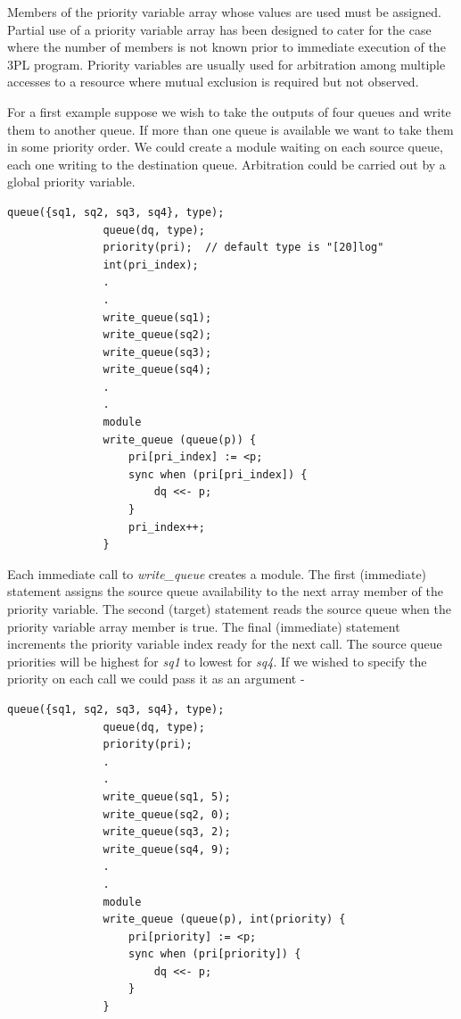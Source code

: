         Members of the priority variable array whose values are used must be
        assigned. Partial use of a priority variable array has been designed to
        cater for the case where the number of members is not known prior to
        immediate execution of the 3PL program. Priority variables are usually
        used for arbitration among multiple accesses to a resource where mutual
        exclusion is required but not observed.

        For a first example suppose we wish to take the outputs of four queues
        and write them to another queue. If more than one queue is available we
        want to take them in some priority order. We could create a module
        waiting on each source queue, each one writing to the destination queue.
        Arbitration could be carried out by a global priority variable.
        \begin{lstlisting}[gobble=8, language=threepl]
               queue({sq1, sq2, sq3, sq4}, type);
               queue(dq, type);
               priority(pri);  // default type is "[20]log"
               int(pri_index);
               .
               .
               write_queue(sq1);
               write_queue(sq2);
               write_queue(sq3);
               write_queue(sq4);
               .
               .
               module
               write_queue (queue(p)) {
                   pri[pri_index] := <p;
                   sync when (pri[pri_index]) {
                       dq <<- p;
                   }
                   pri_index++;
               }
        \end{lstlisting}
        Each immediate call to {\em write\_queue} creates a module. The first
        (immediate) statement assigns the source queue availability to the
        next array member of the priority variable. The second (target)
        statement reads the source queue when the priority variable
        array member is true. The final (immediate) statement increments the
        priority variable index ready for the next call. The source queue
        priorities will be highest for {\em sq1} to lowest for {\em sq4}. If
        we wished to specify the priority on each call we could pass it as an
        argument -
        \begin{lstlisting}[gobble=8, language=threepl]
               queue({sq1, sq2, sq3, sq4}, type);
               queue(dq, type);
               priority(pri);
               .
               .
               write_queue(sq1, 5);
               write_queue(sq2, 0);
               write_queue(sq3, 2);
               write_queue(sq4, 9);
               .
               .
               module
               write_queue (queue(p), int(priority) {
                   pri[priority] := <p;
                   sync when (pri[priority]) {
                       dq <<- p;
                   }
               }
        \end{lstlisting}










